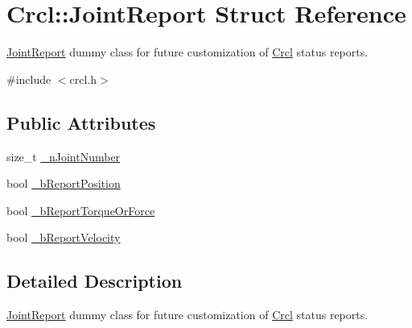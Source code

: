 \hypertarget{structCrcl_1_1JointReport}{\section{Crcl\-:\-:Joint\-Report Struct Reference}
\label{structCrcl_1_1JointReport}
}


\hyperlink{structCrcl_1_1JointReport}{Joint\-Report} dummy class for future customization of \hyperlink{namespaceCrcl}{Crcl} status reports.  




{\ttfamily \#include $<$crcl.\-h$>$}

\subsection*{Public Attributes}
\begin{DoxyCompactItemize}
\item 
size\-\_\-t \hyperlink{structCrcl_1_1JointReport_ac49defefe1565597177b1363dec3eb66}{\-\_\-n\-Joint\-Number}
\item 
bool \hyperlink{structCrcl_1_1JointReport_a768a2ddefebd748006d8295f863a2faf}{\-\_\-b\-Report\-Position}
\item 
bool \hyperlink{structCrcl_1_1JointReport_a8688287259bf8e0619a6f4a06a3c5721}{\-\_\-b\-Report\-Torque\-Or\-Force}
\item 
bool \hyperlink{structCrcl_1_1JointReport_aea4383b9bb5263ec07cc151d574442c9}{\-\_\-b\-Report\-Velocity}
\end{DoxyCompactItemize}


\subsection{Detailed Description}
\hyperlink{structCrcl_1_1JointReport}{Joint\-Report} dummy class for future customization of \hyperlink{namespaceCrcl}{Crcl} status reports. 

